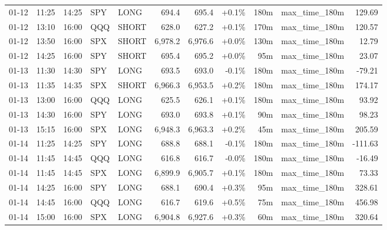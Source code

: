 \documentclass[11pt,a4paper,twoside]{article}
\begin{document}
\begin{center}
\begin{longtable}{>{\color{txtmain}}l l l l l r r r r >{\color{txtmain}}l r}
01-12 & 11:25 & 14:25 & SPY & LONG & 694.4 & 695.4 & \textcolor{wingreen}{+0.1\%} & 180m & max\_time\_180m & \textcolor{wingreen}{129.69} \\
01-12 & 13:10 & 16:00 & QQQ & SHORT & 628.0 & 627.2 & \textcolor{wingreen}{+0.1\%} & 170m & max\_time\_180m & \textcolor{wingreen}{120.57} \\
01-12 & 13:50 & 16:00 & SPX & SHORT & 6,978.2 & 6,976.6 & \textcolor{wingreen}{+0.0\%} & 130m & max\_time\_180m & \textcolor{wingreen}{12.79} \\
01-12 & 14:25 & 16:00 & SPY & SHORT & 695.4 & 695.2 & \textcolor{wingreen}{+0.0\%} & 95m & max\_time\_180m & \textcolor{wingreen}{23.07} \\
01-13 & 11:30 & 14:30 & SPY & LONG & 693.5 & 693.0 & \textcolor{lossred}{-0.1\%} & 180m & max\_time\_180m & \textcolor{lossred}{-79.21} \\
01-13 & 11:35 & 14:35 & SPX & SHORT & 6,966.3 & 6,953.5 & \textcolor{wingreen}{+0.2\%} & 180m & max\_time\_180m & \textcolor{wingreen}{174.17} \\
01-13 & 13:00 & 16:00 & QQQ & LONG & 625.5 & 626.1 & \textcolor{wingreen}{+0.1\%} & 180m & max\_time\_180m & \textcolor{wingreen}{93.92} \\
01-13 & 14:30 & 16:00 & SPY & LONG & 693.0 & 693.8 & \textcolor{wingreen}{+0.1\%} & 90m & max\_time\_180m & \textcolor{wingreen}{98.23} \\
01-13 & 15:15 & 16:00 & SPX & LONG & 6,948.3 & 6,963.3 & \textcolor{wingreen}{+0.2\%} & 45m & max\_time\_180m & \textcolor{wingreen}{205.59} \\
01-14 & 11:25 & 14:25 & SPY & LONG & 688.8 & 688.1 & \textcolor{lossred}{-0.1\%} & 180m & max\_time\_180m & \textcolor{lossred}{-111.63} \\
01-14 & 11:45 & 14:45 & QQQ & LONG & 616.8 & 616.7 & \textcolor{lossred}{-0.0\%} & 180m & max\_time\_180m & \textcolor{lossred}{-16.49} \\
01-14 & 11:45 & 14:45 & SPX & LONG & 6,899.9 & 6,905.7 & \textcolor{wingreen}{+0.1\%} & 180m & max\_time\_180m & \textcolor{wingreen}{73.33} \\
01-14 & 14:25 & 16:00 & SPY & LONG & 688.1 & 690.4 & \textcolor{wingreen}{+0.3\%} & 95m & max\_time\_180m & \textcolor{wingreen}{328.61} \\
01-14 & 14:45 & 16:00 & QQQ & LONG & 616.7 & 619.6 & \textcolor{wingreen}{+0.5\%} & 75m & max\_time\_180m & \textcolor{wingreen}{456.98} \\
01-14 & 15:00 & 16:00 & SPX & LONG & 6,904.8 & 6,927.6 & \textcolor{wingreen}{+0.3\%} & 60m & max\_time\_180m & \textcolor{wingreen}{320.64} \\

\end{longtable}
\end{center}
\end{document}
